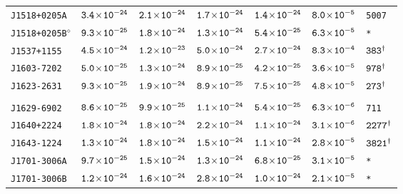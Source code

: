 \begin{longtable}{l | c | c | c | c | c | l}
\scriptsize{\tt{J1518+0205A}} & \scriptsize{$\tt{3.4\!\times\!10^{-24}}$} & \scriptsize{$\tt{2.1\!\times\!10^{-24}}$} & \scriptsize{$\tt{1.7\!\times\!10^{-24}}$} &\scriptsize{$\tt{1.4\!\times\!10^{-24}}$} & \scriptsize{$\tt{8.0\!\times\!10^{-5}}$} & \scriptsize{\tt{5007}} \\[-16pt] 
\scriptsize{\tt{J1518+0205B}$^{\diamond}$} & \scriptsize{$\tt{9.3\!\times\!10^{-25}}$} &
\scriptsize{$\tt{1.8\!\times\!10^{-24}}$} & \scriptsize{$\tt{1.3\!\times\!10^{-24}}$} & \scriptsize{$\tt{5.4\!\times\!10^{-25}}$}
& \scriptsize{$\tt{6.3\!\times\!10^{-5}}$} & \scriptsize{\tt{*}} \\[-16pt] 
\scriptsize{\tt{J1537+1155}} & \scriptsize{$\tt{4.5\!\times\!10^{-24}}$} & \scriptsize{$\tt{1.2\!\times\!10^{-23}}$} & \scriptsize{$\tt{5.0\!\times\!10^{-24}}$} & \scriptsize{$\tt{2.7\!\times\!10^{-24}}$} & \scriptsize{$\tt{8.3\!\times\!10^{-4}}$} & \scriptsize{$\tt{383^{\dagger}}$} \\[-16pt] 
\scriptsize{\tt{J1603-7202}} & \scriptsize{$\tt{5.0\!\times\!10^{-25}}$} & \scriptsize{$\tt{1.3\!\times\!10^{-24}}$} & \scriptsize{$\tt{8.9\!\times\!10^{-25}}$} & \scriptsize{$\tt{4.2\!\times\!10^{-25}}$} & \scriptsize{$\tt{3.6\!\times\!10^{-5}}$} & \scriptsize{$\tt{978^{\dagger}}$} \\[-16pt] 
\scriptsize{\tt{J1623-2631}} & \scriptsize{$\tt{9.3\!\times\!10^{-25}}$} & \scriptsize{$\tt{1.9\!\times\!10^{-24}}$} & \scriptsize{$\tt{8.9\!\times\!10^{-25}}$} & \scriptsize{$\tt{7.5\!\times\!10^{-25}}$} & \scriptsize{$\tt{4.8\!\times\!10^{-5}}$} & \scriptsize{$\tt{273^{\dagger}}$} \\[-16pt] 
\\[-20pt] 
\scriptsize{\tt{J1629-6902}} & \scriptsize{$\tt{8.6\!\times\!10^{-25}}$} & \scriptsize{$\tt{9.9\!\times\!10^{-25}}$} & \scriptsize{$\tt{1.1\!\times\!10^{-24}}$} &\scriptsize{$\tt{5.4\!\times\!10^{-25}}$} & \scriptsize{$\tt{6.3\!\times\!10^{-6}}$} & \scriptsize{\tt{711}} \\[-16pt] 
\scriptsize{\tt{J1640+2224}} & \scriptsize{$\tt{1.8\!\times\!10^{-24}}$} & \scriptsize{$\tt{1.8\!\times\!10^{-24}}$} & \scriptsize{$\tt{2.2\!\times\!10^{-24}}$} & \scriptsize{$\tt{1.1\!\times\!10^{-24}}$} & \scriptsize{$\tt{3.1\!\times\!10^{-6}}$} & \scriptsize{$\tt{2277^{\dagger}}$} \\[-16pt] 
\scriptsize{\tt{J1643-1224}} & \scriptsize{$\tt{1.3\!\times\!10^{-24}}$} & \scriptsize{$\tt{1.8\!\times\!10^{-24}}$} & \scriptsize{$\tt{1.5\!\times\!10^{-24}}$} & \scriptsize{$\tt{1.1\!\times\!10^{-24}}$} & \scriptsize{$\tt{2.8\!\times\!10^{-5}}$} & \scriptsize{$\tt{3821^{\dagger}}$} \\[-16pt] 
\scriptsize{\tt{J1701-3006A}} & \scriptsize{$\tt{9.7\!\times\!10^{-25}}$} & \scriptsize{$\tt{1.5\!\times\!10^{-24}}$} & \scriptsize{$\tt{1.3\!\times\!10^{-24}}$} & \scriptsize{$\tt{6.8\!\times\!10^{-25}}$} & \scriptsize{$\tt{3.1\!\times\!10^{-5}}$} & \scriptsize{\tt{*}} \\[-16pt] 
\scriptsize{\tt{J1701-3006B}} & \scriptsize{$\tt{1.2\!\times\!10^{-24}}$} & \scriptsize{$\tt{1.6\!\times\!10^{-24}}$} & \scriptsize{$\tt{2.8\!\times\!10^{-24}}$} & \scriptsize{$\tt{1.0\!\times\!10^{-24}}$} & \scriptsize{$\tt{2.1\!\times\!10^{-5}}$} & \scriptsize{\tt{*}} \\[-16pt] 

\end{longtable}
